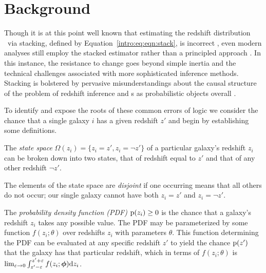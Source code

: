 \section{Background}


Though it is at this point well known that estimating the redshift distribution \Nz\ via stacking, defined by Equation~\ref{intro:eq:eqn:stack}, is incorrect \citep{leistedt_hierarchical_2016, malz_chippr_2019}, even modern analyses still employ the stacked estimator rather than a principled approach \citep{sheldon_photometric_2012, hoyle_dark_2017}.
In this instance, the resistance to change goes beyond simple inertia and the technical challenges associated with more sophisticated inference methods.
Stacking is bolstered by pervasive misunderstandings about the causal structure of the problem of redshift inference and \pzpdf s as probabilistic objects overall \citep{gruen_sumzz_2017, jarvis_rmjarvis_2018, malz_aimalz_2018}.


To identify and expose the roots of these common errors of logic we consider the chance that a single galaxy $i$ has a given redshift $z'$ and begin by establishing some definitions.

\begin{definition}\label{def:binarystatespace}
	The \textit{state space} $\Omega(z_{i}) = \{z_{i} = z', z_{i} = \lnot z'\}$ of a particular galaxy's redshift $z_{i}$ can be broken down into two states, that of redshift equal to $z'$ and that of any other redshift $\lnot z'$.
\end{definition}

\begin{definition}\label{def:disjoint}
	The elements of the state space are \textit{disjoint} if one occurring means that all others do not occur; our single galaxy cannot have both $z_{i} = z'$ and $z_{i} = \lnot z'$.
\end{definition}

\begin{definition}\label{def:pdens}
	The \textit{probability density function (PDF)} $\mathrm{p}(z_{i}) \geq 0$ is the chance that a galaxy's redshift $z_{i}$ takes any possible value.
	The PDF may be parameterized by some function $f(z_{i}; \theta)$ over redshifts $z_{i}$ with parameters $\theta$.
	This function determining the PDF can be evaluated at any specific redshift $z'$ to yield the chance $\mathrm{p}(z')$ that the galaxy has that particular redshift, which in terms of $f(z_{i}; \theta)$ is $\lim_{\varepsilon \to 0} \int_{z' - \varepsilon}^{z' + \varepsilon} f(z_{i}; {\boldsymbol{\phi}}) \mathrm{d}z_{i}$.
\end{definition}

